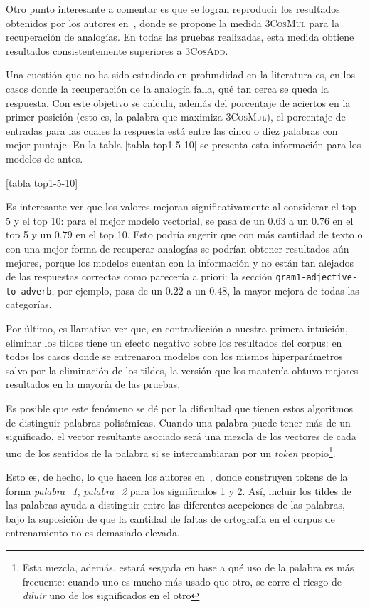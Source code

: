 Otro punto interesante a comentar es que se logran reproducir los resultados obtenidos por los
autores en~\cite{Levy2014b}, donde se propone la medida \textsc{3CosMul} para la recuperación de
analogías. En todas las pruebas realizadas, esta medida obtiene resultados consistentemente
superiores a \textsc{3CosAdd}.


Una cuestión que no ha sido estudiado en profundidad en la literatura es, en los casos donde la
recuperación de la analogía falla, qué tan cerca se queda la respuesta. Con este objetivo se
calcula, además del porcentaje de aciertos en la primer posición (esto es, la palabra que maximiza
\textsc{3CosMul}), el porcentaje de entradas para las cuales la respuesta está entre las cinco o
diez palabras con mejor puntaje. En la tabla [tabla top1-5-10] se presenta esta información para los
modelos de antes.

[tabla top1-5-10]

Es interesante ver que los valores mejoran significativamente al considerar el top 5 y el top 10:
para el mejor modelo vectorial, se pasa de un $0.63$ a un $0.76$ en el top 5 y un $0.79$ en el top
10. Esto podría sugerir que con más cantidad de texto o con una mejor forma de recuperar analogías
se podrían obtener resultados aún mejores, porque los modelos cuentan con la información y no están
tan alejados de las respuestas correctas como parecería a priori: la sección
\texttt{gram1-adjective-to-adverb}, por ejemplo, pasa de un $0.22$ a un $0.48$, la mayor mejora de
todas las categorías.


Por último, es llamativo ver que, en contradicción a nuestra primera intuición, eliminar los tildes
tiene un efecto negativo sobre los resultados del corpus: en todos los casos donde se entrenaron
modelos con los mismos hiperparámetros salvo por la eliminación de los tildes, la versión que los
mantenía obtuvo mejores resultados en la mayoría de las pruebas.

Es posible que este fenómeno se dé por la dificultad que tienen estos algoritmos de distinguir
palabras polisémicas. Cuando una palabra puede tener más de un significado, el vector resultante
asociado será una mezcla de los vectores de cada uno de los sentidos de la palabra si se
intercambiaran por un \textit{token} propio\footnote{Esta mezcla, además, estará sesgada en base a
qué uso de la palabra es más frecuente: cuando uno es mucho más usado que otro, se corre el riesgo
de \textit{diluir} uno de los significados en el otro}.

Esto es, de hecho, lo que hacen los autores en~\cite{Huang2012,Tian2014}, donde construyen tokens de
la forma \textit{palabra\_1}, \textit{palabra\_2} para los significados 1 y 2. Así, incluir los
tildes de las palabras ayuda a distinguir entre las diferentes acepciones de las palabras, bajo la
suposición de que la cantidad de faltas de ortografía en el corpus de entrenamiento no es demasiado
elevada.

